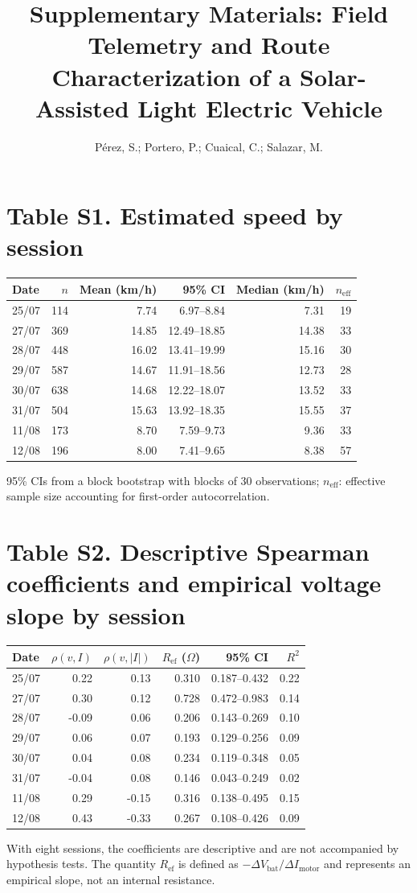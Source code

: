\documentclass[10pt,a4paper]{article}
\title{Supplementary Materials: Field Telemetry and Route Characterization of a Solar-Assisted Light Electric Vehicle}
\author{Pérez, S.; Portero, P.; Cuaical, C.; Salazar, M.}
\date{}
\begin{document}
\maketitle
\small

\section*{Table S1. Estimated speed by session}
\begin{center}
\begin{tabular}{lrrrrr}
\toprule
Date & $n$ & Mean (km/h) & 95\% CI & Median (km/h) & $n_{\mathrm{eff}}$\\
\midrule
25/07 & 114 & 7.74 & 6.97--8.84 & 7.31 & 19\\
27/07 & 369 & 14.85 & 12.49--18.85 & 14.38 & 33\\
28/07 & 448 & 16.02 & 13.41--19.99 & 15.16 & 30\\
29/07 & 587 & 14.67 & 11.91--18.56 & 12.73 & 28\\
30/07 & 638 & 14.68 & 12.22--18.07 & 13.52 & 33\\
31/07 & 504 & 15.63 & 13.92--18.35 & 15.55 & 37\\
11/08 & 173 & 8.70 & 7.59--9.73 & 9.36 & 33\\
12/08 & 196 & 8.00 & 7.41--9.65 & 8.38 & 57\\
\bottomrule
\end{tabular}
\end{center}
95\% CIs from a block bootstrap with blocks of 30 observations; $n_{\mathrm{eff}}$: effective sample size accounting for first-order autocorrelation.

\section*{Table S2. Descriptive Spearman coefficients and empirical voltage slope by session}
\begin{center}
\begin{tabular}{lrrrrr}
\toprule
Date & $\rho(v,I)$ & $\rho(v,|I|)$ & $R_{\mathrm{ef}}$ ($\Omega$) & 95\% CI & $R^2$\\
\midrule
25/07 & 0.22 & 0.13 & 0.310 & 0.187--0.432 & 0.22\\
27/07 & 0.30 & 0.12 & 0.728 & 0.472--0.983 & 0.14\\
28/07 & -0.09 & 0.06 & 0.206 & 0.143--0.269 & 0.10\\
29/07 & 0.06 & 0.07 & 0.193 & 0.129--0.256 & 0.09\\
30/07 & 0.04 & 0.08 & 0.234 & 0.119--0.348 & 0.05\\
31/07 & -0.04 & 0.08 & 0.146 & 0.043--0.249 & 0.02\\
11/08 & 0.29 & -0.15 & 0.316 & 0.138--0.495 & 0.15\\
12/08 & 0.43 & -0.33 & 0.267 & 0.108--0.426 & 0.09\\
\bottomrule
\end{tabular}
\end{center}
With eight sessions, the coefficients are descriptive and are not accompanied by hypothesis tests. The quantity $R_{\mathrm{ef}}$ is defined as $-\Delta V_{\mathrm{bat}}/\Delta I_{\mathrm{motor}}$ and represents an empirical slope, not an internal resistance.
\end{document}
